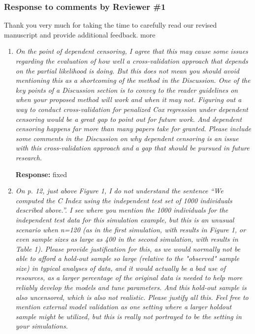 \documentclass{article}
\newcommand{\re}{\textbf{Response: }}
\newcommand\pb[1]{{\color{red}#1}}
\begin{document}
\subsubsection*{Response to comments by Reviewer \#1}

Thank you very much for taking the time to carefully read our revised manuscript and provide additional feedback. \pb{more}

\begin{enumerate}[align = left]
  
\item \emph{On the point of dependent censoring, I agree that this may cause some issues regarding the evaluation of how well a cross-validation approach that depends on the partial likelihood is doing. But this does not mean you should avoid mentioning this as a shortcoming of the method in the Discussion.  One of the key points of a Discussion section is to convey to the reader guidelines on when your proposed method will work and when it may not. Figuring out a way to conduct cross-validation for penalized Cox regression under dependent censoring would be a great gap to point out for future work.  And dependent censoring happens far more than many papers take for granted. Please include some comments in the Discussion on why dependent censoring is an issue with this cross-validation approach and a gap that should be pursued in future research.}
  
  \re \pb{fixed}

\item \emph{On p. 12, just above Figure 1, I do not understand the sentence “We computed the C Index using the independent test set of 1000 individuals described above.”. I see where you mention the 1000 individuals for the independent test data for this simulation example, but this is an unusual scenario when n=120 (as in the first simulation, with results in Figure 1, or even sample sizes as large as 400 in the second simulation, with results in Table 1).  Please provide justification for this, as we would normally not be able to afford a hold-out sample so large (relative to the "observed" sample size) in typical analyses of data, and it would actually be a bad use of resources, as a larger percentage of the original data is needed to help more reliably develop the models and tune parameters. And this hold-out sample is also uncensored, which is also not realistic. Please justify all this. Feel free to mention external model validation as one setting where a larger holdout sample might be utilized, but this is really not portrayed to be the setting in your simulations.}


\end{enumerate}
\end{document}
